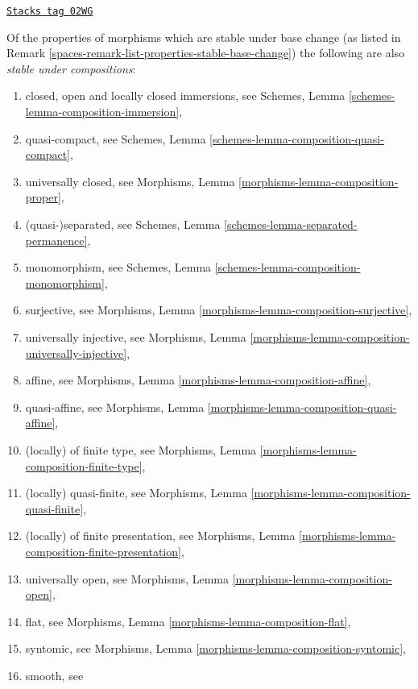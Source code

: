 \begin{remark}
\label{spaces-remark-list-properties-stable-composition}
\href{https://stacks.math.columbia.edu/tag/02WG}{\texttt{Stacks tag 02WG}}

Of the properties of morphisms which are stable under base change
(as listed in
Remark \ref{spaces-remark-list-properties-stable-base-change})
the following are also {\it stable under compositions}:
\begin{enumerate}
\item closed, open and locally closed immersions, see
Schemes, Lemma \ref{schemes-lemma-composition-immersion},
\item quasi-compact, see
Schemes, Lemma \ref{schemes-lemma-composition-quasi-compact},
\item universally closed, see
Morphisms, Lemma \ref{morphisms-lemma-composition-proper},
\item (quasi-)separated, see
Schemes, Lemma \ref{schemes-lemma-separated-permanence},
\item monomorphism, see
Schemes, Lemma \ref{schemes-lemma-composition-monomorphism},
\item surjective, see
Morphisms, Lemma \ref{morphisms-lemma-composition-surjective},
\item universally injective, see
Morphisms, Lemma \ref{morphisms-lemma-composition-universally-injective},
\item affine, see
Morphisms, Lemma \ref{morphisms-lemma-composition-affine},
\item quasi-affine, see
Morphisms, Lemma \ref{morphisms-lemma-composition-quasi-affine},
\item (locally) of finite type, see
Morphisms, Lemma \ref{morphisms-lemma-composition-finite-type},
\item (locally) quasi-finite, see
Morphisms, Lemma \ref{morphisms-lemma-composition-quasi-finite},
\item (locally) of finite presentation, see
Morphisms, Lemma \ref{morphisms-lemma-composition-finite-presentation},
\item universally open, see
Morphisms, Lemma \ref{morphisms-lemma-composition-open},
\item flat, see
Morphisms, Lemma \ref{morphisms-lemma-composition-flat},
\item syntomic, see
Morphisms, Lemma \ref{morphisms-lemma-composition-syntomic},
\item smooth, see

\end{enumerate}
\end{remark}
